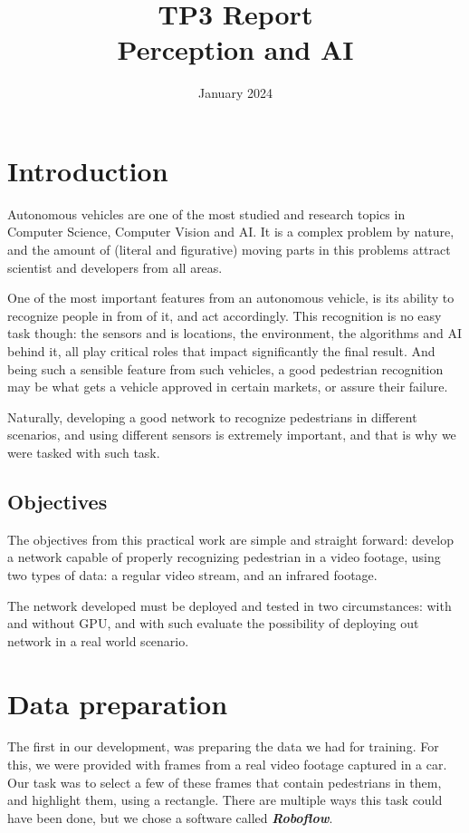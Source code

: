 \documentclass[conference]{IEEEtran}
\title{TP3 Report \\ Perception and AI}
\author{\IEEEauthorblockN{Bruno Luiz Dias Alves de Castro}
\IEEEauthorblockA{\textit{ESIEE Paris}}
\and
\IEEEauthorblockN{Victor Gabriel Mendes Sündermann}
\IEEEauthorblockA{\textit{ESIEE Paris}}
}
\date{January 2024}
\begin{document}
\maketitle

\section{Introduction}

Autonomous vehicles are one of the most studied and research topics in Computer Science, Computer Vision and AI. It is a complex problem by nature, and the amount of (literal and figurative) moving parts in this problems attract scientist and developers from all areas.

One of the most important features from an autonomous vehicle, is its ability to recognize people in from of it, and act accordingly. This recognition is no easy task though: the sensors and is locations, the environment, the algorithms and AI behind it, all play critical roles that impact significantly the final result. And being such a sensible feature from such vehicles, a good pedestrian recognition may be what gets a vehicle approved in certain markets, or assure their failure.

Naturally, developing a good network to recognize pedestrians in different scenarios, and using different sensors is extremely important, and that is why we were tasked with such task.

\subsection{Objectives}

The objectives from this practical work are simple and straight forward: develop a network capable of properly recognizing pedestrian in a video footage, using two types of data: a regular video stream, and an infrared footage.

The network developed must be deployed and tested in two circumstances: with and without GPU, and with such evaluate the possibility of deploying out network in a real world scenario.

\section{Data preparation}

The first in our development, was preparing the data we had for training. For this, we were provided with frames from a real video footage captured in a car. Our task was to select a few of these frames that contain pedestrians in them, and highlight them, using a rectangle. There are multiple ways this task could have been done, but we chose a software called \textit{\textbf{Roboflow}}.
\end{document}
